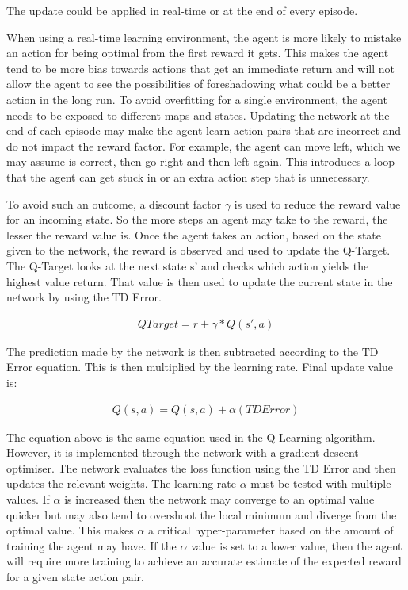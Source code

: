 The update could be applied in real-time or at the end of every episode.

When using a real-time learning environment, the agent is more likely to mistake
an action for being optimal from the first reward it gets. This makes the agent
tend to be more bias towards actions that get an immediate return and will not
allow the agent to see the possibilities of foreshadowing what could be a better
action in the long run. To avoid overfitting for a single environment, the agent
needs to be exposed to different maps and states. Updating the network at the
end of each episode may make the agent learn action pairs that are incorrect and
do not impact the reward factor. For example, the agent can move left, which we
may assume is correct, then go right and then left again. This introduces a loop
that the agent can get stuck in or an extra action step that is unnecessary.

To avoid such an outcome, a discount factor $\gamma$ is used to reduce the
reward value for an incoming state. So the more steps an agent may take to the
reward, the lesser the reward value is. Once the agent takes an action, based on
the state given to the network, the reward is observed and used to update the
Q-Target. The Q-Target looks at the next state s' and checks which action yields
the highest value return. That value is then used to update the current state in
the network by using the TD Error.

\begin{align}
    QTarget = r + \gamma*Q(s',a)
\end{align}

The prediction made by the network is then subtracted according to the TD Error
equation. This is then multiplied by the learning rate. Final update value
is:

\begin{align}
    Q(s,a) = Q(s,a) + \alpha (TDError)
\end{align}

The equation above is the same equation used in the Q-Learning algorithm.
However, it is implemented through the network with a gradient descent
optimiser. The network evaluates the loss function using the TD Error and then
updates the relevant weights. The learning rate $\alpha$ must be tested with
multiple values. If $\alpha$ is increased then the network may converge to an
optimal value quicker but may also tend to overshoot the local minimum and
diverge from the optimal value. This makes $\alpha$ a critical hyper-parameter
based on the amount of training the agent may have. If the $\alpha$ value is set
to a lower value, then the agent will require more training to achieve an
accurate estimate of the expected reward for a given state action pair.

